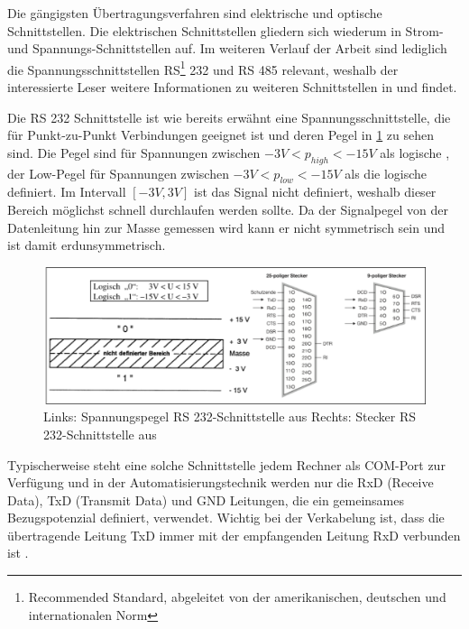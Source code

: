 Die gängigsten Übertragungsverfahren sind elektrische und optische Schnittstellen. Die elektrischen Schnittstellen gliedern sich wiederum in Strom- und Spannungs-Schnittstellen auf. Im weiteren Verlauf der Arbeit sind lediglich die Spannungsschnittstellen RS\footnote{Recommended Standard, abgeleitet von der amerikanischen, deutschen und internationalen Norm} 232 und RS 485 relevant, weshalb der interessierte Leser weitere Informationen zu weiteren Schnittstellen in \cite[S.~13ff.]{sch08} und \cite[S.~57ff.]{schn06} findet.

Die RS 232 Schnittstelle ist wie bereits erwähnt eine Spannungsschnittstelle, die für Punkt-zu-Punkt Verbindungen geeignet ist und deren Pegel in \ref{fig:rs232} zu sehen sind. Die Pegel sind für Spannungen zwischen $-3V<p_{high}<-15V$ als logische \Gob, der Low-Pegel für Spannungen zwischen $-3V<p_{low}<-15V$ als die logische \Gob definiert. Im Intervall $[-3V,3V]$ ist das Signal nicht definiert, weshalb dieser Bereich möglichst schnell durchlaufen werden sollte. Da der Signalpegel von der Datenleitung hin zur Masse gemessen wird kann er nicht symmetrisch sein und ist damit erdunsymmetrisch. \cite[S.~57f.]{schn06}

\begin{figure}
\centering
\includegraphics[width=\textwidth]{abbildungen/20160314_rs232}
\caption[Spannungspegel und Stecker der RS 232-Schnittstelle]{Links: Spannungspegel RS 232-Schnittstelle aus \cite[S.~57]{schn06} \newline Rechts: Stecker RS 232-Schnittstelle aus \cite[S.~14]{sch08}}
\label{fig:rs232}
\end{figure}

Typischerweise steht eine solche Schnittstelle jedem Rechner als COM-Port zur Verfügung und in der Automatisierungstechnik werden nur die RxD (Receive Data), TxD (Transmit Data) und GND Leitungen, die ein gemeinsames Bezugspotenzial definiert, verwendet. Wichtig bei der Verkabelung ist, dass die übertragende Leitung TxD immer mit der empfangenden Leitung RxD verbunden ist \cite[S.~14f.]{sch08}.

